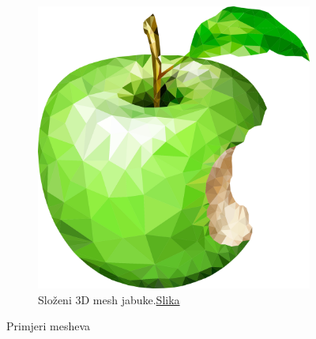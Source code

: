 \documentclass[zavrsnirad]{../fer}
\begin{document}
\begin{figure}[htbp]
\begin{subfigure}[b]{0.45\linewidth}
    \includegraphics[width=\linewidth]{Figures/apple.png}
    \caption{Složeni 3D mesh jabuke.\href{https://pixabay.com/vectors/apple-fruit-green-apple-nature-1590131/}{Slika}}
    \label{jabuka}
  \end{subfigure}
  \caption{Primjeri mesheva}
  \label{meshevi}
\end{figure}
\end{document}
